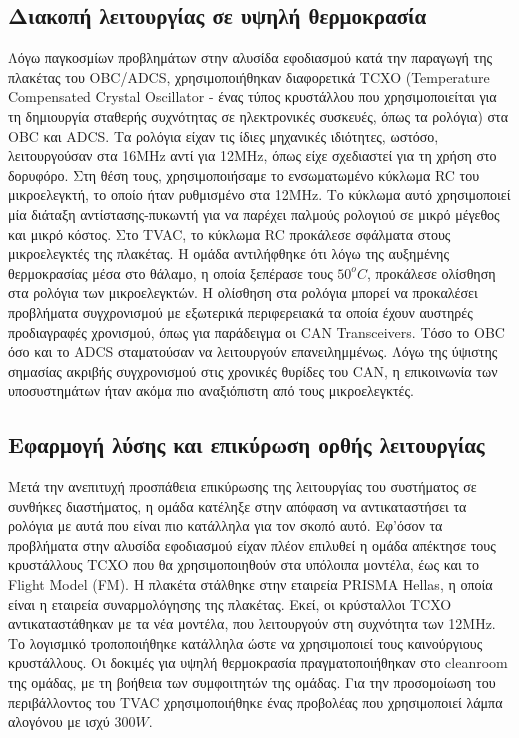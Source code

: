 \documentclass[a4paper,nobib,justified]{tufte-book}
\begin{document}
	\subsection{Διακοπή λειτουργίας σε υψηλή θερμοκρασία}
	Λόγω παγκοσμίων προβλημάτων στην αλυσίδα εφοδιασμού κατά την παραγωγή της πλακέτας του OBC/ADCS, χρησιμοποιήθηκαν διαφορετικά TCXO (Temperature Compensated Crystal Oscillator - ένας τύπος κρυστάλλου που χρησιμοποιείται για τη δημιουργία σταθερής συχνότητας σε ηλεκτρονικές συσκευές, όπως τα ρολόγια) στα OBC και ADCS. Τα ρολόγια είχαν τις ίδιες μηχανικές ιδιότητες, ωστόσο, λειτουργούσαν στα 16MHz αντί για 12MHz, όπως είχε σχεδιαστεί για τη χρήση στο δορυφόρο. Στη θέση τους, χρησιμοποιήσαμε το ενσωματωμένο κύκλωμα RC του μικροελεγκτή, το οποίο ήταν ρυθμισμένο στα 12MHz. Το κύκλωμα αυτό χρησιμοποιεί μία διάταξη αντίστασης-πυκωντή για να παρέχει παλμούς ρολογιού σε μικρό μέγεθος και μικρό κόστος. Στο TVAC, το κύκλωμα RC προκάλεσε σφάλματα στους μικροελεγκτές της πλακέτας. Η ομάδα αντιλήφθηκε ότι λόγω της αυξημένης θερμοκρασίας μέσα στο θάλαμο, η οποία ξεπέρασε τους $50^o C$, προκάλεσε ολίσθηση στα ρολόγια των μικροελεγκτών. Η ολίσθηση στα ρολόγια μπορεί να προκαλέσει προβλήματα συγχρονισμού με εξωτερικά περιφερειακά τα οποία έχουν αυστηρές προδιαγραφές χρονισμού, όπως για παράδειγμα οι CAN Transceivers. Τόσο το OBC όσο και το ADCS σταματούσαν να λειτουργούν επανειλημμένως. Λόγω της ύψιστης σημασίας ακριβής συγχρονισμού στις χρονικές θυρίδες του CAN, η επικοινωνία των υποσυστημάτων ήταν ακόμα πιο αναξιόπιστη από τους μικροελεγκτές.

	\subsection{Εφαρμογή λύσης και επικύρωση ορθής λειτουργίας}
	Μετά την ανεπιτυχή προσπάθεια επικύρωσης της λειτουργίας του συστήματος σε συνθήκες διαστήματος, η ομάδα κατέληξε στην απόφαση να αντικαταστήσει τα ρολόγια με αυτά που είναι πιο κατάλληλα για τον σκοπό αυτό. Εφ'όσον τα προβλήματα στην αλυσίδα εφοδιασμού είχαν πλέον επιλυθεί η ομάδα απέκτησε τους κρυστάλλους TCXO που θα χρησιμοποιηθούν στα υπόλοιπα μοντέλα, έως και το Flight Model (FM). Η πλακέτα στάλθηκε στην εταιρεία PRISMA Hellas, η οποία είναι η εταιρεία συναρμολόγησης της πλακέτας. Εκεί, οι κρύσταλλοι TCXO αντικαταστάθηκαν με τα νέα μοντέλα, που λειτουργούν στη συχνότητα των 12MHz. Το λογισμικό τροποποιήθηκε κατάλληλα ώστε να χρησιμοποιεί τους καινούργιους κρυστάλλους. Οι δοκιμές για υψηλή θερμοκρασία πραγματοποιήθηκαν στο cleanroom της ομάδας, με τη βοήθεια των συμφοιτητών της ομάδας. Για την προσομοίωση του περιβάλλοντος του TVAC χρησιμοποιήθηκε ένας προβολέας που χρησιμοποιεί λάμπα αλογόνου με ισχύ $300W$.
	
\end{document}
